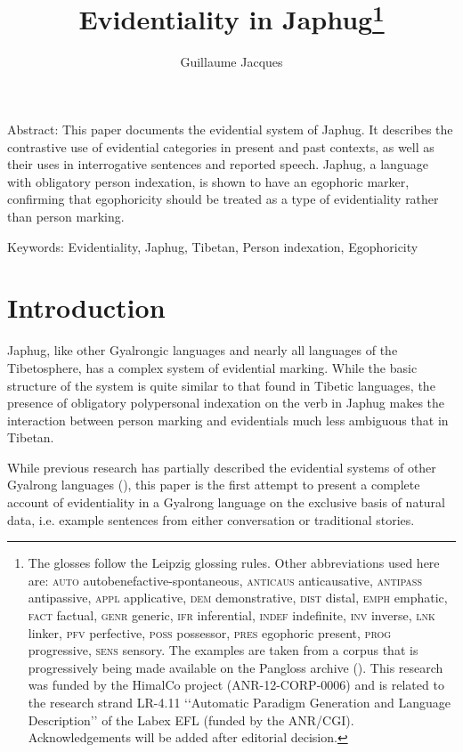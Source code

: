 \documentclass[oldfontcommands,oneside,a4paper,11pt]{article}
\begin{document}
 
\title{Evidentiality in Japhug\footnote{ The glosses follow the Leipzig glossing rules. Other abbreviations used here are: \textsc{auto}  autobenefactive-spontaneous, \textsc{anticaus} anticausative, \textsc{antipass} antipassive, \textsc{appl} applicative, \textsc{dem} demonstrative,  \textsc{dist} distal, \textsc{emph} emphatic, \textsc{fact} factual, \textsc{genr} generic, \textsc{ifr} inferential, \textsc{indef} indefinite, \textsc{inv} inverse,  \textsc{lnk} linker, \textsc{pfv} perfective, \textsc{poss} possessor, \textsc{pres} egophoric present, \textsc{prog} progressive, \textsc{sens} sensory. The examples are taken from a corpus that is progressively being made available on the Pangloss archive (\citealt{michailovsky14pangloss}). This research was funded by the HimalCo project (ANR-12-CORP-0006) and is related to the research strand LR-4.11 ‘‘Automatic Paradigm Generation and Language Description’’ of the Labex EFL (funded by the ANR/CGI). Acknowledgements   will be added after editorial decision. %
} }
\author{Guillaume Jacques}
\maketitle
\linenumbers

Abstract: This paper documents the evidential system of Japhug. It describes the contrastive use of evidential categories in present and past contexts, as well as their uses in interrogative sentences and reported speech. Japhug, a language with obligatory person indexation, is shown to have an egophoric marker, confirming that egophoricity should be treated as a type of evidentiality rather than person marking. 

Keywords: Evidentiality, Japhug, Tibetan, Person indexation, Egophoricity 

\section{Introduction}
Japhug, like other Gyalrongic languages and nearly all languages of the Tibetosphere, has a complex system of evidential marking. While the basic structure of the system is quite similar to that found in Tibetic languages, the presence of obligatory polypersonal indexation on the verb in Japhug makes the interaction between person marking and evidentials much less ambiguous that in Tibetan.

While previous research has partially described the evidential systems of other Gyalrong languages (\citealt{linyj03tense}), this paper is the first attempt to present a complete account of evidentiality in a Gyalrong language on the exclusive basis of natural data, i.e. example sentences from either conversation or traditional stories.
\end{document}

